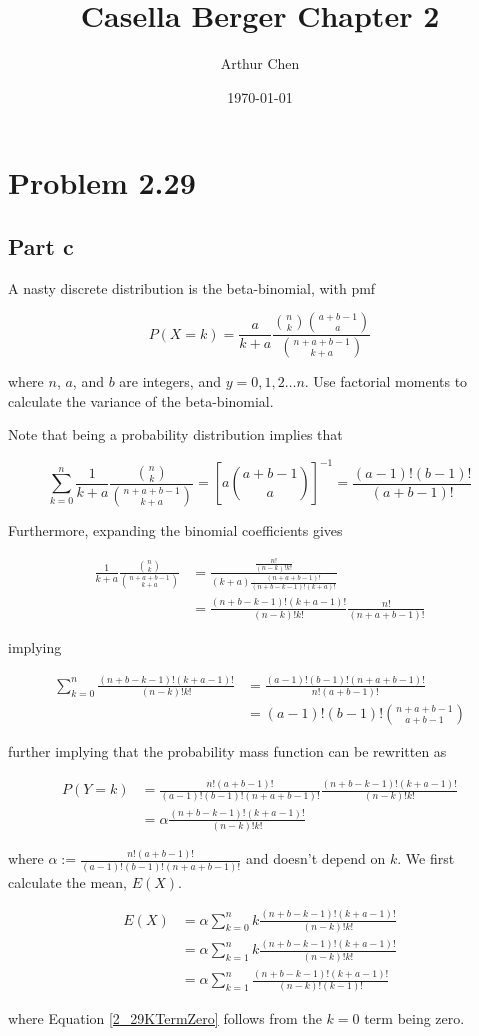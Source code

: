 \documentclass{article}
\author{Arthur Chen}
\title{Casella Berger Chapter 2}
\date{\today}
\begin{document}
\maketitle

\section*{Problem 2.29}

\subsection*{Part c}

A nasty discrete distribution is the beta-binomial, with pmf

\[
P(X=k) = \frac{a}{k+a}
\frac{{n \choose k} {a+b-1 \choose a}}
{{n+a+b-1 \choose k+a}}
\]

where $n$, $a$, and $b$ are integers, and $y = 0, 1, 2 \dots n$. Use factorial moments to calculate the variance of the beta-binomial.

Note that being a probability distribution implies that

\[
\sum_{k=0}^n \frac{1}{k+a}
\frac{{n \choose k}}{{n+a+b-1 \choose k+a}}
=
[a {a+b-1 \choose a}]^{-1}
=
\frac{(a-1)!(b-1)!}{(a+b-1)!}
\]

Furthermore, expanding the binomial coefficients gives

\begin{align*}
\frac{1}{k+a}
\frac{{n \choose k}}{{n+a+b-1 \choose k+a}}
&=
\frac{\frac{n!}{(n-k)!k!}}
{
(k+a)
\frac{(n+a+b-1)!}{(n+b-k-1)!(k+a)!}
} \\
&=
\frac{(n+b-k-1)!(k+a-1)!}{(n-k)!k!}
\frac{n!}{(n+a+b-1)!}
\end{align*}

implying

\begin{align}
\sum_{k=0}^n \frac{(n+b-k-1)!(k+a-1)!}{(n-k)!k!}
&=\frac{(a-1)!(b-1)!(n+a+b-1)!}{n!(a+b-1)!} \\
&=(a-1)!(b-1)!{n+a+b-1 \choose a+b-1}
\end{align}

further implying that the probability mass function can be rewritten as

\begin{align}
P(Y=k) &=
\frac{n!(a+b-1)!}{(a-1)!(b-1)!(n+a+b-1)!} \frac{(n+b-k-1)!(k+a-1)!}{(n-k)!k!} \\
&= \alpha \frac{(n+b-k-1)!(k+a-1)!}{(n-k)!k!}
\end{align}

where $\alpha := \frac{n!(a+b-1)!}{(a-1)!(b-1)!(n+a+b-1)!}$ and doesn't depend on $k$. We first calculate the mean, $E(X)$.

\begin{align}
E(X) &= \alpha \sum_{k=0}^n
k \frac{(n+b-k-1)!(k+a-1)!}{(n-k)!k!} \\
\label{2_29KTermZero}
&= \alpha \sum_{k=1}^n
k \frac{(n+b-k-1)!(k+a-1)!}{(n-k)!k!} \\
&= \alpha \sum_{k=1}^n
\frac{(n+b-k-1)!(k+a-1)!}{(n-k)!(k-1)!}
\end{align}

where Equation \ref{2_29KTermZero} follows from the $k=0$ term being zero. 
\end{document}
